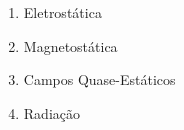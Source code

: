\begin{framed}
\begin{enumerate}
\item Eletrostática
\item Magnetostática
\item Campos Quase-Estáticos
\item Radiação
\end{enumerate}
\end{framed}